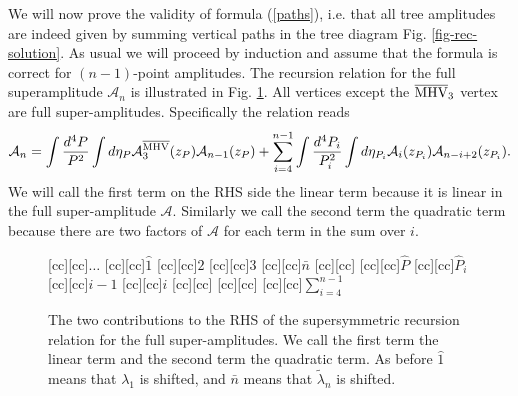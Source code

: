 \documentclass[12pt]{article}
\begin{document}
{We will now prove the validity of formula (\ref{paths}), i.e. that all tree amplitudes are indeed given by summing vertical paths in the tree diagram Fig. \ref{fig-rec-solution}. As usual we will proceed by induction and assume that the formula is correct for $(n-1)$-point amplitudes. The recursion relation for the full superamplitude $\mathcal{A}_n$ is illustrated in Fig. \ref{fig-fullrecur}. All vertices except the $\overline{\rm MHV}_3$ vertex are full super-amplitudes. Specifically the relation reads
\begin{align}
\mathcal{A}_n = \int \frac{d^4P}{P^2} \int d \eta_P \mathcal{A}^{\overline{\rm MHV}}_3(z_P) \mathcal{A}_{n-1}(z_P) + \sum_{i=4}^{n-1} \int \frac{d^4P_i}{P_i^2} \int d\eta_{P_i} \mathcal{A}_i (z_{P_i}) \mathcal{A}_{n-i+2}(z_{P_i}).
\label{fullrecursion}
\end{align}
We will call the first term on the RHS side the linear term because it is linear in the full super-amplitude $\mathcal{A}$. Similarly we call the second term the quadratic term because there are two factors of $\mathcal{A}$ for each term in the sum over $i$.

\begin{figure}
[cc][cc]{$\ldots$}
[cc][cc]{$\hat{1}$}
[cc][cc]{$2$}
[cc][cc]{$3$}
[cc][cc]{$\bar{n}$}
[cc][cc]{$$}
[cc][cc]{$\hat{P}$}
[cc][cc]{$\hat{P}_{i}$}
[cc][cc]{\hspace{0.5cm}$i-1$}
[cc][cc]{$i$}
[cc][cc]{$$}
[cc][cc]{$$}
[cc][cc]{$\sum_{i=4}^{n-1}$}
 \centerline{{
}}  \caption[]{\small
  The two contributions to the RHS of the supersymmetric recursion relation for the full super-amplitudes. We call the first term the linear term and the second term the quadratic term. As before
    $\hat{1}$ means that $\lambda_{1}$ is shifted, and $\bar{n}$ means that $\tilde{\lambda}_{n}$ is shifted.}
  \label{fig-fullrecur}
\end{figure}

}
\end{document}
